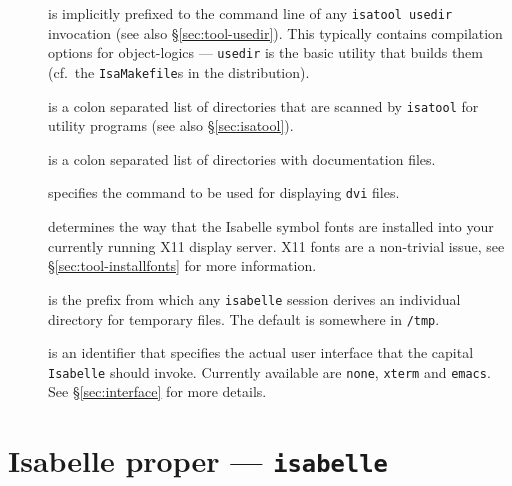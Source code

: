 \begin{description}
\item[] is implicitly prefixed to the
  command line of any \texttt{isatool usedir} invocation (see also
  \S\ref{sec:tool-usedir}). This typically contains compilation
  options for object-logics --- \texttt{usedir} is the basic utility
  that builds them (cf.\ the \texttt{IsaMakefile}s in the
  distribution).

\item[] is a colon separated list of
  directories that are scanned by \texttt{isatool} for utility
  programs (see also \S\ref{sec:isatool}).

\item[] is a colon separated list of directories
  with documentation files.
  
\item[] specifies the command to be used for
  displaying \texttt{dvi} files.

\item[] determines the way that the
  Isabelle symbol fonts are installed into your currently running X11
  display server. X11 fonts are a non-trivial issue, see
  \S\ref{sec:tool-installfonts} for more information.
  
\item[] is the prefix from which any
  \texttt{isabelle} session derives an individual directory for
  temporary files.  The default is somewhere in \texttt{/tmp}.
  
\item[] is an identifier that specifies the
  actual user interface that the capital \texttt{Isabelle} should
  invoke.  Currently available are \texttt{none}, \texttt{xterm} and
  \texttt{emacs}. See \S\ref{sec:interface} for more details.

\end{description}


\section{Isabelle proper --- \texttt{isabelle}}

